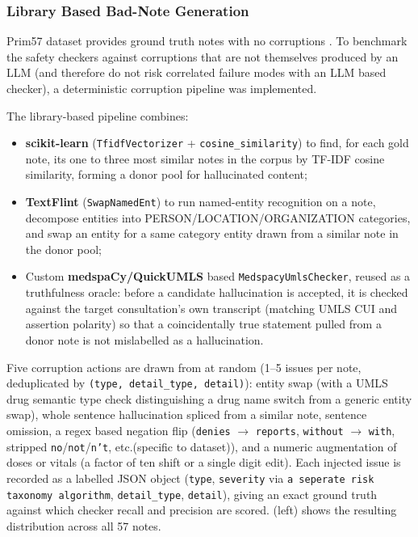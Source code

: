 \documentclass[11pt,a4paper]{article}
\begin{document}
\subsubsection*{Library Based Bad-Note Generation}
Prim57 dataset provides ground truth  notes with no corruptions \cite{korfiatis2022primock57} . To benchmark the safety checkers against corruptions that are not themselves
produced by an LLM (and therefore do not risk correlated failure modes with
an LLM based checker), a deterministic corruption pipeline was implemented. 

The library-based pipeline combines:
\begin{itemize}
    \item \textbf{scikit-learn} (\texttt{TfidfVectorizer} +
    \texttt{cosine\_similarity}) to find, for each gold note, its one to three
    most similar notes in the corpus by TF-IDF cosine similarity, forming a
    donor pool for hallucinated content;
    \item \textbf{TextFlint} (\texttt{SwapNamedEnt}) to run named-entity
    recognition on a note, decompose entities into
    PERSON/LOCATION/ORGANIZATION categories, and swap an entity for a
    same category entity drawn from a similar note in the donor pool;
    \item  Custom \textbf{medspaCy/QuickUMLS} based
    \texttt{MedspacyUmlsChecker}, reused as a truthfulness oracle: before a
    candidate hallucination is accepted, it is checked against the target
    consultation's own transcript (matching UMLS CUI and assertion polarity)
    so that a coincidentally true statement pulled from a donor note is not
    mislabelled as a hallucination.
\end{itemize}

Five corruption actions are drawn from at random (1--5 issues per note,
deduplicated by \texttt{(type, detail\_type, detail)}): entity swap (with a
UMLS drug semantic type check distinguishing a drug name switch from a
generic entity swap), whole sentence hallucination spliced from a similar
note, sentence omission, a regex based negation flip (\texttt{denies}
$\rightarrow$ \texttt{reports}, \texttt{without} $\rightarrow$
\texttt{with}, stripped \texttt{no}/\texttt{not}/\texttt{n't}, etc.(specific to dataset)), and a
numeric augmentation of doses or vitals (a factor of ten shift or a
single digit edit). Each injected issue is recorded as a labelled JSON
object (\texttt{type}, \texttt{severity} via
\texttt{a seperate risk taxonomy algorithm}, \texttt{detail\_type},
\texttt{detail}), giving an exact ground truth against which checker recall
and precision are scored.  (left) shows
the resulting distribution across all 57 notes.
\end{document}
